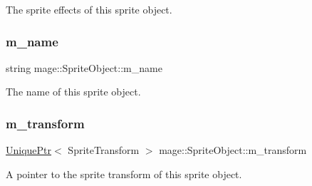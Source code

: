 The sprite effects of this sprite object. \hypertarget{classmage_1_1_sprite_object_a6f2a859e40ed391909bb4c87a8b74480}{}\label{classmage_1_1_sprite_object_a6f2a859e40ed391909bb4c87a8b74480} 
\subsubsection{\texorpdfstring{m\+\_\+name}{m\_name}}
{\footnotesize\ttfamily string mage\+::\+Sprite\+Object\+::m\+\_\+name\hspace{0.3cm}{\ttfamily [private]}}

The name of this sprite object. \hypertarget{classmage_1_1_sprite_object_a9523ae6f081a8fde3cbb3558f6e327da}{}\label{classmage_1_1_sprite_object_a9523ae6f081a8fde3cbb3558f6e327da} 
\subsubsection{\texorpdfstring{m\+\_\+transform}{m\_transform}}
{\footnotesize\ttfamily \hyperlink{namespacemage_a8c307fbcc33bce9b7f2aa4c26c3b95cf}{Unique\+Ptr}$<$ Sprite\+Transform $>$ mage\+::\+Sprite\+Object\+::m\+\_\+transform\hspace{0.3cm}{\ttfamily [private]}}

A pointer to the sprite transform of this sprite object. 